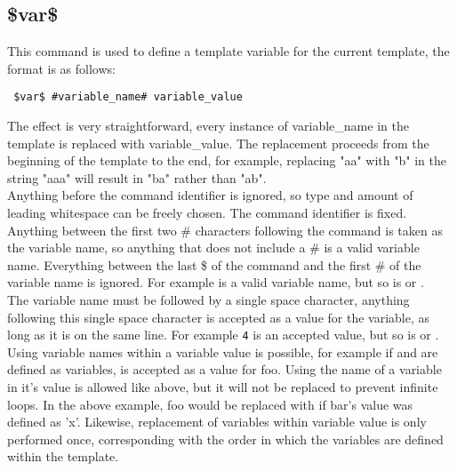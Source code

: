 \documentclass{settings/TU_Delft_Report}
\begin{document}
\subsection{\$var\$}
This command is used to define a template variable for the current template, the format is as follows:
\begin{lstlisting}
 $var$ #variable_name# variable_value
\end{lstlisting}

The effect is very straightforward, every instance of variable\_name in the template is replaced with variable\_value. The replacement proceeds from the beginning of the template to the end, for example, replacing "aa" with "b" in the string "aaa" will result in "ba" rather than "ab".\\

Anything before the command identifier is ignored, so type and amount of leading whitespace can be freely chosen. The  command identifier is fixed.\\

Anything between the first two \# characters following the  command is taken as the variable name, so anything that does not include a \# is a valid variable name. Everything between the last \$ of the command and the first \# of the variable name is ignored. For example  is a valid variable name, but so is  or .\\

The variable name must be followed by a single space character, anything following this single space character is accepted as a value for the variable, as long as it is on the same line. For example \lstinline{4} is an accepted value, but so is  or  .\\

Using variable names within a variable value is possible, for example if  and  are defined as variables,  is accepted as a value for foo. Using the name of a variable in it's value is allowed like above, but it will not be replaced to prevent infinite loops. In the above example, foo would be replaced with  if bar's value was defined as 'x'. Likewise, replacement of variables within variable value is only performed once, corresponding with the order in which the variables are defined within the template.
\end{document}
